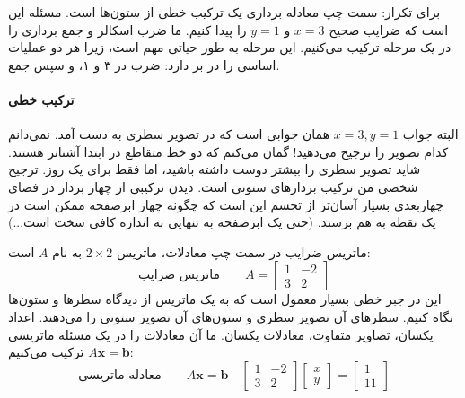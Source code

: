 \documentclass[12pt, a4paper]{book}
\begin{document}
	برای تکرار: سمت چپ معادله برداری یک ترکیب خطی از ستون‌ها است. مسئله این است که ضرایب صحیح \( x=3 \) و \( y=1 \) را پیدا کنیم. ما ضرب اسکالر و جمع برداری را در یک مرحله ترکیب می‌کنیم. این مرحله به طور حیاتی مهم است، زیرا هر دو عملیات اساسی را در بر دارد: ضرب در ۳ و ۱، و سپس جمع.
	
	\paragraph{ترکیب خطی}
	البته جواب \( x=3, y=1 \) همان جوابی است که در تصویر سطری به دست آمد. نمی‌دانم کدام تصویر را ترجیح می‌دهید! گمان می‌کنم که دو خط متقاطع در ابتدا آشناتر هستند. شاید تصویر سطری را بیشتر دوست داشته باشید، اما فقط برای یک روز. ترجیح شخصی من ترکیب بردارهای ستونی است. دیدن ترکیبی از چهار بردار در فضای چهاربعدی بسیار آسان‌تر از تجسم این است که چگونه چهار ابرصفحه ممکن است در یک نقطه به هم برسند. (حتی یک ابرصفحه به تنهایی به اندازه کافی سخت است...)
	
	ماتریس ضرایب در سمت چپ معادلات، ماتریس \( 2 \times 2 \) به نام \( A \) است:
	\[
	\text{ماتریس ضرایب} \quad\quad A = \begin{bmatrix} 1 & -2 \\ 3 & 2 \end{bmatrix}
	\]
	این در جبر خطی بسیار معمول است که به یک ماتریس از دیدگاه سطرها و ستون‌ها نگاه کنیم. سطرهای آن تصویر سطری و ستون‌های آن تصویر ستونی را می‌دهند. اعداد یکسان، تصاویر متفاوت، معادلات یکسان. ما آن معادلات را در یک مسئله ماتریسی \( A\mathbf{x}=\mathbf{b} \) ترکیب می‌کنیم:
	\[
	\text{معادله ماتریسی} \quad\quad A\mathbf{x}=\mathbf{b} \quad \begin{bmatrix} 1 & -2 \\ 3 & 2 \end{bmatrix} \begin{bmatrix} x \\ y \end{bmatrix} = \begin{bmatrix} 1 \\ 11 \end{bmatrix}
	\]
	
\end{document}
